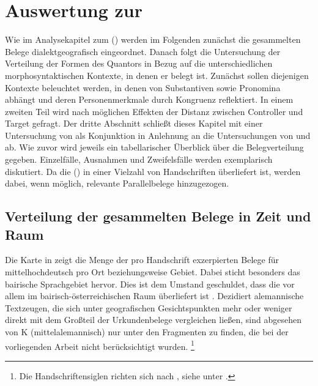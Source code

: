 \chapter{Auswertung zur }
\label{ch:kcanalyse}

Wie im Analysekapitel zum  (\CAO)
werden im Folgenden zunächst die gesammelten Belege dialektgeografisch
eingeordnet. Danach folgt die Untersuchung der Verteilung der Formen des
Quantors  in Bezug auf die unterschiedlichen morphosyntaktischen
Kontexte, in denen er belegt ist. Zunächst sollen diejenigen Kontexte
beleuchtet werden, in denen  von Substantiven sowie Pronomina
abhängt und deren Personenmerkmale durch Kongruenz
reflektiert. In einem zweiten Teil wird nach möglichen Effekten der Distanz
zwischen Controller und Target gefragt. Der dritte Abschnitt schließt dieses
Kapitel mit einer Untersuchung von  als Konjunktion in Anlehnung an
die Untersuchungen von \citet{askedal1974} und \citet{gjelsten1980} ab. Wie
zuvor wird jeweils ein tabellarischer Überblick über die Belegverteilung
gegeben. Einzelfälle, Ausnahmen und Zweifelsfälle werden exemplarisch
diskutiert. Da die  (\KC{}) in einer Vielzahl von
Handschriften überliefert ist, werden dabei, wenn möglich, relevante
Parallelbelege hinzugezogen.

\section{Verteilung der gesammelten Belege in Zeit und Raum}
\label{subsec:beiddispmap}


Die Karte in  zeigt die Menge der pro Handschrift
exzerpierten Belege für mittelhochdeutsch  pro Ort beziehungsweise
Gebiet. Dabei sticht besonders das bairische Sprachgebiet hervor.
Dies ist dem Umstand geschuldet, dass die \KC{} vor allem im
bairisch-österreichischen Raum überliefert ist
\autocite{klein1988}. Dezidiert alemannische
Textzeugen, die sich unter geografischen Gesichtspunkten mehr oder weniger
direkt mit dem Großteil der Urkundenbelege vergleichen ließen, sind
abgesehen von K (mittelalemannisch) nur unter den Fragmenten zu
finden, die bei der vorliegenden Arbeit nicht berücksichtigt wurden.%
%
	\footnote{Die Handschriftensiglen richten sich nach ,
		siehe unter .%
	}

